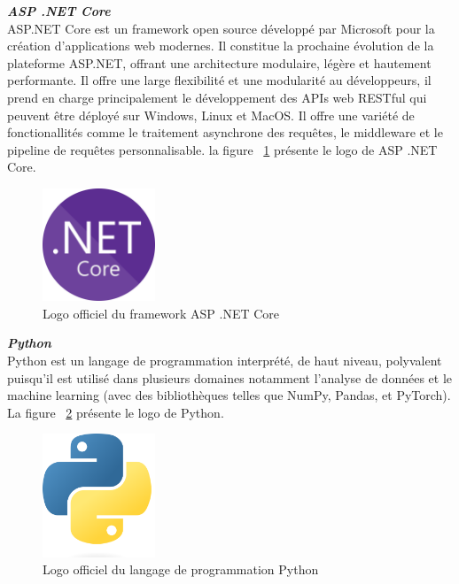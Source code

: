 \noindent
{\small\textbf{\textit{ASP .NET Core}}}\mbox{}\\
ASP.NET Core est un framework open source développé par Microsoft pour la création d'applications web modernes. Il constitue la prochaine évolution de la plateforme ASP.NET, offrant une architecture modulaire, légère et hautement performante. Il offre une large flexibilité et une modularité au développeurs, il prend en charge principalement le développement des APIs web RESTful qui peuvent être déployé sur Windows, Linux et MacOS. Il offre une variété de fonctionallités comme le traitement asynchrone des requêtes, le middleware et le pipeline de requêtes personnalisable.
la figure ~\ref{fig:netcore} présente le logo de ASP .NET Core.
\begin{figure}[H]
\centering
\includegraphics[width=0.3\textwidth]{logos/dotnetcore.png}
\caption{Logo officiel du framework ASP .NET Core}
\label{fig:netcore}
\end{figure}

\noindent
{\small\textbf{\textit{Python}}}\mbox{}\\
Python est un langage de programmation interprété, de haut niveau, polyvalent puisqu'il est utilisé dans plusieurs domaines notamment l'analyse de données et le machine learning (avec des bibliothèques telles que NumPy, Pandas, et PyTorch). La figure ~\ref{fig:py} présente le logo de Python.
\begin{figure}[H]
\centering
\includegraphics[width=0.3\textwidth]{logos/pypng.png}
\caption{Logo officiel du langage de programmation Python}
\label{fig:py}
\end{figure}

